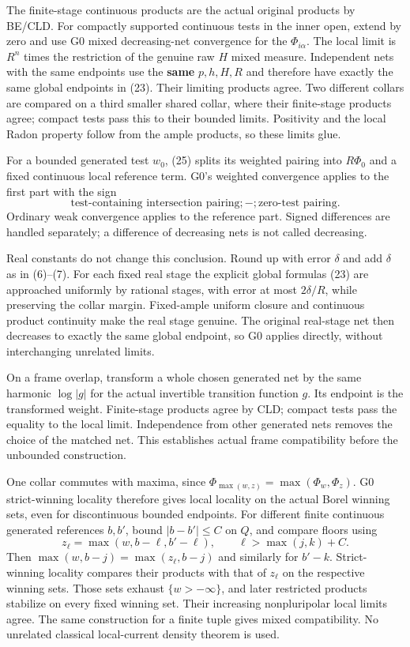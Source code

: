 \documentclass[
  10pt,
]{article}
\begin{document}
The finite-stage continuous products are the actual original products by
BE/CLD. For compactly supported continuous tests in the inner open,
extend by zero and use G0 mixed decreasing-net convergence for the
\(\Phi_{i\alpha}\). The local limit is \(R^n\) times the restriction of
the genuine raw \(H\) mixed measure. Independent nets with the same
endpoints use the \textbf{same} \(p,h,H,R\) and therefore have exactly
the same global endpoints in (23). Their limiting products agree. Two
different collars are compared on a third smaller shared collar, where
their finite-stage products agree; compact tests pass this to their
bounded limits. Positivity and the local Radon property follow from the
ample products, so these limits glue.

For a bounded generated test \(w_0\), (25) splits its weighted pairing
into \(R\Phi_0\) and a fixed continuous local reference term. G0's
weighted convergence applies to the first part with the sign
\[\text{test-containing intersection pairing};-;\text{zero-test pairing}.\tag{26}\]
Ordinary weak convergence applies to the reference part. Signed
differences are handled separately; a difference of decreasing nets is
not called decreasing.

Real constants do not change this conclusion. Round up with error
\(\delta\) and add \(\delta\) as in (6)--(7). For each fixed real stage
the explicit global formulas (23) are approached uniformly by rational
stages, with error at most \(2\delta/R\), while preserving the collar
margin. Fixed-ample uniform closure and continuous product continuity
make the real stage genuine. The original real-stage net then decreases
to exactly the same global endpoint, so G0 applies directly, without
interchanging unrelated limits.

On a frame overlap, transform a whole chosen generated net by the same
harmonic \(\log|g|\) for the actual invertible transition function
\(g\). Its endpoint is the transformed weight. Finite-stage products
agree by CLD; compact tests pass the equality to the local limit.
Independence from other generated nets removes the choice of the matched
net. This establishes actual frame compatibility before the unbounded
construction.

One collar commutes with maxima, since
\(\Phi_{\max(w,z)}=\max(\Phi_w,\Phi_z)\). G0 strict-winning locality
therefore gives local locality on the actual Borel winning sets, even
for discontinuous bounded endpoints. For different finite continuous
generated references \(b,b'\), bound \(|b-b'|\leq C\) on \(Q\), and
compare floors using
\[z_\ell=\max(w,b-\ell,b'-\ell),\qquad\ell>\max(j,k)+C.\tag{27}\] Then
\(\max(w,b-j)=\max(z_\ell,b-j)\) and similarly for \(b'-k\).
Strict-winning locality compares their products with that of \(z_\ell\)
on the respective winning sets. Those sets exhaust \(\{w>-\infty\}\),
and later restricted products stabilize on every fixed winning set.
Their increasing nonpluripolar local limits agree. The same construction
for a finite tuple gives mixed compatibility. No unrelated classical
local-current density theorem is used.
\end{document}
